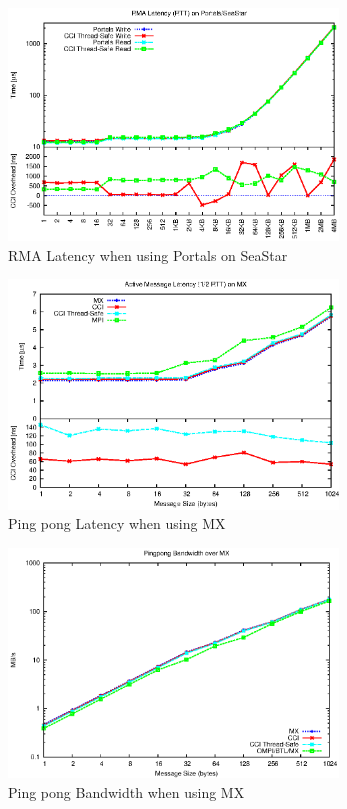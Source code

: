 \begin{figure}[htbp]
\centering
\includegraphics[width=3.45in]{one-sided-latency-portals-overhead.eps}
\caption{RMA Latency when using Portals on SeaStar}
\label{fig:latency-rma}
\end{figure}

\begin{figure}[htbp]
\centering
\includegraphics[width=3.45in]{pingpong-latency-mx-overhead-combined.eps}
\caption{Ping pong Latency when using MX}
\label{fig:latency-mx}
\end{figure}

\begin{figure}[htbp]
\centering
\includegraphics[width=3.45in]{pingpong-bw-mx.eps}
\caption{Ping pong Bandwidth when using MX}
\label{fig:bw-mx}
\end{figure}

